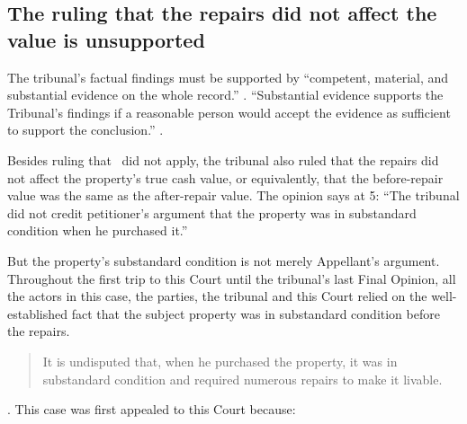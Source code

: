 \documentclass[12pt,\documentclassflag]{michiganCourtOfAppealsBrief}
\begin{document}


\subsection{The ruling that the repairs did not affect the value is unsupported}

The tribunal's factual findings must be supported by ``competent, material, and substantial evidence on the whole record.'' . ``Substantial evidence supports the Tribunal's findings if a reasonable person would accept the evidence as sufficient to support the conclusion.'' . 

Besides ruling that \mathieuGast\ did not apply, %
the tribunal also ruled that the repairs did not affect the property's true cash value, or equivalently, that the before-repair value was the same as the after-repair value. The opinion says at 5: ``The
tribunal did not credit petitioner's argument that the property was in substandard condition when
he purchased it.''

But the property's substandard condition is not merely Appellant's argument. Throughout the first trip to this Court until the tribunal's last Final Opinion, all the actors in this case, the parties, the tribunal and this Court relied on the well-established fact that the subject property was in substandard condition before the repairs.

\begin{quote}
  It is undisputed that, when he purchased the property, it was in substandard condition and required numerous repairs to make it livable.
\end{quote}
.
This case was first appealed to this Court because:
\end{document}
